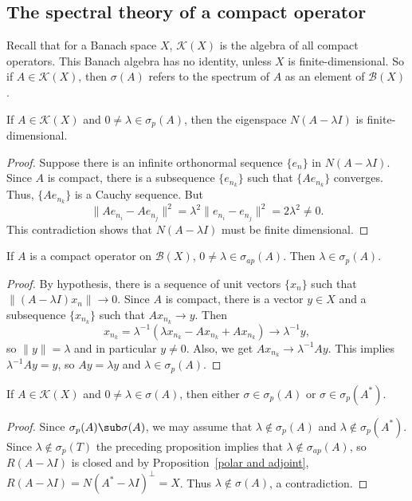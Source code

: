 \subsection{The spectral theory of a compact operator}
Recall that for a Banach space $X$, $\mathcal{K}(X)$ is the algebra of all compact operators. This Banach algebra has no identity, unless $X$ is finite-dimensional. So if $A\in\mathcal{K}(X)$, then $\sigma(A)$ refers to the spectrum of $A$ as an element of $\mathcal{B}(X)$.
\begin{proposition}\label{Banach space compact operator eigenspace finite dim}
If $A\in\mathcal{K}(X)$ and $0\neq\lambda\in\sigma_p(A)$, then the eigenspace $N(A-\lambda I)$ is finite-dimensional.
\end{proposition}
\begin{proof}
Suppose there is an infinite orthonormal sequence $\{e_n\}$ in $N(A-\lambda I)$. Since $A$ is compact, there is a subsequence $\{e_{n_k}\}$ such that $\{Ae_{n_k}\}$ converges. Thus, $\{Ae_{n_k}\}$ is a Cauchy sequence. But
\[\|Ae_{n_i}-Ae_{n_j}\|^2=\lambda^2\|e_{n_i}-e_{n_j}\|^2=2\lambda^2\neq 0.\]
This contradiction shows that $N(A-\lambda I)$ must be finite dimensional.
\end{proof}
\begin{proposition}\label{Banach space compact operator eigenvalue if ap spectrum}
If $A$ is a compact operator on $\mathcal{B}(X)$, $0\neq\lambda\in\sigma_{ap}(A)$. Then $\lambda\in\sigma_p(A)$.
\end{proposition}
\begin{proof}
By hypothesis, there is a sequence of unit vectors $\{x_n\}$ such that $\|(A-\lambda I)x_n\|\to 0$. Since $A$ is compact, there is a vector $y\in X$ and a subsequence $\{x_{n_k}\}$ such that $Ax_{n_k}\to y$. Then
\[x_{n_k}=\lambda^{-1}(\lambda x_{n_k}-Ax_{n_k}+Ax_{n_k})\to\lambda^{-1}y,\]
so $\|y\|=\lambda$ and in particular $y\neq 0$. Also, we get $Ax_{n_k}\to\lambda^{-1}Ay$. This implies $\lambda^{-1}Ay=y$, so $Ay=\lambda y$ and $\lambda\in\sigma_p(A)$.
\end{proof}
\begin{proposition}\label{Banach space spectrum of compact operator is eigen or dual eigen}
If $A\in\mathcal{K}(X)$ and $0\neq \lambda\in\sigma(A)$, then either $\sigma\in\sigma_p(A)$ or $\sigma\in\sigma_p(A^*)$.
\end{proposition}
\begin{proof}
Since $\sigma_p(A)\sub\sigma(A)$, we may assume that $\lambda\notin\sigma_p(A)$ and $\lambda\notin\sigma_p(A^*)$. Since $\lambda\notin\sigma_p(T)$ the preceding proposition implies that $\lambda\notin\sigma_{ap}(A)$, so $R(A-\lambda I)$ is closed and by Proposition~\ref{polar and adjoint}, $R(A-\lambda I)=N(A^*-\lambda I)^\bot=X$. Thus $\lambda\notin\sigma(A)$, a contradiction.
\end{proof}

